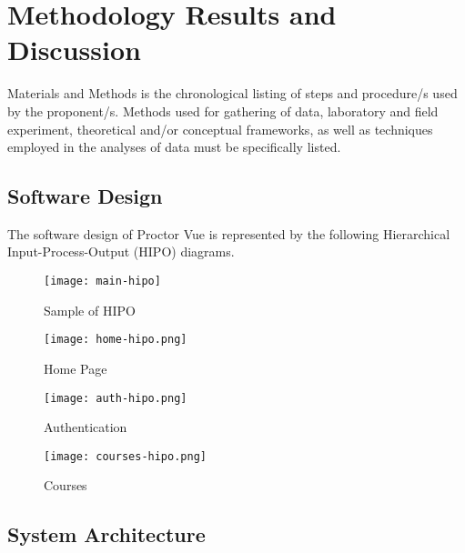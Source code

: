 \chapter{Methodology Results and Discussion}

Materials and Methods is the chronological listing of steps and procedure/s used by the proponent/s.
Methods used for gathering of data, laboratory and field experiment, theoretical and/or conceptual frameworks, as well as techniques employed in the analyses of data must be specifically listed.

\section{Software Design}

The software design of Proctor Vue is represented by the following Hierarchical Input-Process-Output (HIPO) diagrams.

\vspace{1cm}

\begin{figure}[h!]
    \begin{center}
        \texttt{[image: main-hipo]}
        \caption{Sample of HIPO}
    \end{center}
\end{figure}

\begin{figure}[h!]
    \begin{center}
        \texttt{[image: home-hipo.png]}
        \caption{Home Page}
    \end{center}
\end{figure}

\vspace{1cm}

\begin{figure}[h!]
    \begin{center}
        \texttt{[image: auth-hipo.png]}
        \caption{Authentication}
    \end{center}
\end{figure}

\begin{figure}[h!]
    \begin{center}
        \texttt{[image: courses-hipo.png]}
        \caption{Courses}
    \end{center}
\end{figure}

\section{System Architecture}

